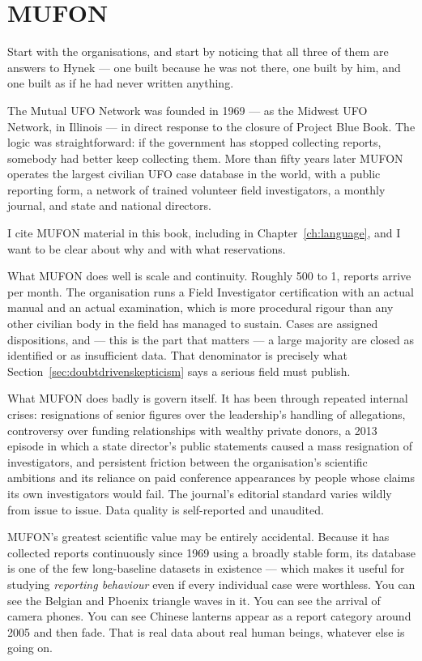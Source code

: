 \section{MUFON}\label{sec:mufon}

Start with the organisations, and start by noticing that all three of them are answers to
Hynek --- one built because he was not there, one built by him, and one built as if he had never
written anything.

The Mutual UFO Network was founded in 1969 --- as the Midwest UFO Network, in Illinois ---
in direct response to the closure of Project Blue Book. The logic was straightforward: if
the government has stopped collecting reports, somebody had better keep collecting them.
More than fifty years later MUFON operates the largest civilian UFO case database in the
world, with a public reporting form, a network of trained volunteer field investigators,
a monthly journal, and state and national directors.

I cite MUFON material in this book, including in Chapter~\ref{ch:language}, and I want to be clear about
why and with what reservations.

What MUFON does well is scale and continuity. Roughly 500 to 1, reports arrive per
month. The organisation runs a Field Investigator certification with an actual manual and
an actual examination, which is more procedural rigour than any other civilian body in the
field has managed to sustain. Cases are assigned dispositions, and --- this is the part
that matters --- a large majority are closed as identified or as insufficient data. That
denominator is precisely what Section~\ref{sec:doubtdrivenskepticism} says a serious field must publish.

What MUFON does badly is govern itself. It has been through repeated internal crises:
resignations of senior figures over the leadership's handling of allegations, controversy
over funding relationships with wealthy private donors, a 2013 episode in which a state
director's public statements caused a mass resignation of investigators, and persistent
friction between the organisation's scientific ambitions and its reliance on paid
conference appearances by people whose claims its own investigators would fail. The
journal's editorial standard varies wildly from issue to issue. Data quality is
self-reported and unaudited.

\begin{funfact}
MUFON's greatest scientific value may be entirely accidental. Because it has collected
reports continuously since 1969 using a broadly stable form, its database is one of the
few long-baseline datasets in existence --- which makes it useful for studying
\emph{reporting behaviour} even if every individual case were worthless. You can see the
Belgian and Phoenix triangle waves in it. You can see the arrival of camera phones. You
can see Chinese lanterns appear as a report category around 2005 and then fade. That is
real data about real human beings, whatever else is going on.
\end{funfact}

